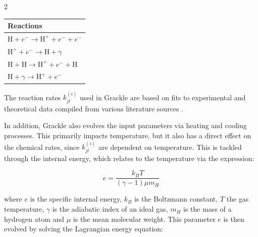 \documentclass[10pt,a4paper]{article}
\begin{document}
\begin{multicols}{2}
\begin{center}
    \begin{tabular}{l}
    \hline
    Reactions \\
    \hline
    $\mathrm{H}+e^{-} \rightarrow \mathrm{H}^{+}+e^{-}+e^{-}$ \\
    $\mathrm{H}^{+}+e^{-} \rightarrow \mathrm{H}+\gamma$ \\
    $\mathrm{H}+\mathrm{H} \rightarrow \mathrm{H}^{+}+e^{-}+\mathrm{H}$ \\
    $\mathrm{H}+\gamma \rightarrow \mathrm{H}^{+}+e^{-}$ \\
    \hline
    \end{tabular}
    \label{tab:reacts}
\end{center}

The reaction rates $k_{jl}^{(i)}$ used in Grackle are based on fits to experimental and theoretical data compiled from various literature sources \cite{smith2017grackle}.

In addition, Grackle also evolves the input parameters via heating and cooling processes. This primarily impacts temperature, but it also has a direct effect on the chemical rates, since $k_{jl}^{(i)}$ are dependent on temperature. This is tackled through the internal energy, which relates to the temperature via the expression:

\begin{equation}
e=\frac{k_BT}{(\gamma-1)\mu m_{H}}
\label{eq:e}
\end{equation}


where $e$ is the specific internal energy, $k_B$ is the Boltzmann constant, $T$ the gas temperature, $\gamma$ is the adiabatic index of an ideal gas, $m_{H}$ is the mass of a hydrogen atom and $\mu$ is the mean molecular weight. This parameter $e$ is then evolved by solving the Lagrangian energy equation:



\end{multicols}
\end{document}
